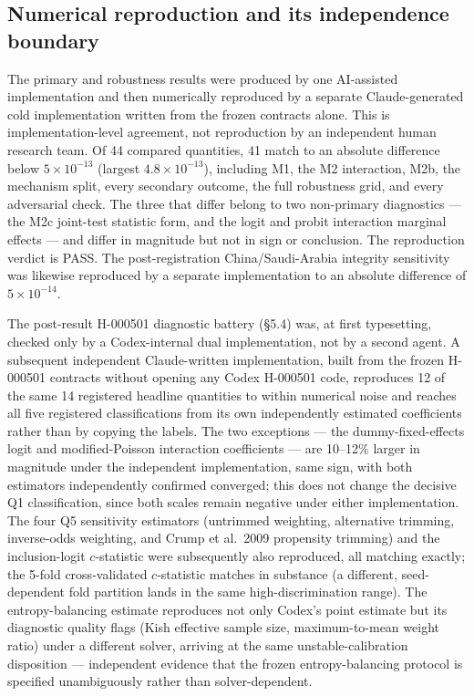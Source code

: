 


\subsection{Numerical reproduction and its independence boundary}

The primary and robustness results were produced by one AI-assisted implementation and then
numerically reproduced by a separate Claude-generated cold implementation written from the
frozen contracts alone. This is implementation-level agreement, not reproduction by an
independent human research team. Of 44 compared
quantities, 41 match to an absolute difference below $5\times10^{-13}$ (largest
$4.8\times10^{-13}$), including M1, the M2 interaction, M2b, the mechanism split, every
secondary outcome, the full robustness grid, and every adversarial check. The three that
differ belong to two non-primary diagnostics --- the M2c joint-test statistic form, and the
logit and probit interaction marginal effects --- and differ in magnitude but not in sign or
conclusion. The reproduction verdict is PASS. The post-registration China/Saudi-Arabia
integrity sensitivity was likewise reproduced by a separate implementation to an absolute
difference of $5\times10^{-14}$.

The post-result H-000501 diagnostic battery (\S5.4) was, at first typesetting, checked only by
a Codex-internal dual implementation, not by a second agent. A subsequent independent
Claude-written implementation, built from the frozen H-000501 contracts without opening any
Codex H-000501 code, reproduces 12 of the same 14 registered headline quantities to within
numerical noise and reaches all five registered classifications from its own independently
estimated coefficients rather than by copying the labels. The two exceptions --- the
dummy-fixed-effects logit and modified-Poisson interaction coefficients --- are 10--12\% larger
in magnitude under the independent implementation, same sign, with both estimators
independently confirmed converged; this does not change the decisive Q1 classification, since
both scales remain negative under either implementation. The four Q5 sensitivity estimators
(untrimmed weighting, alternative trimming, inverse-odds weighting, and Crump et al.\ 2009
propensity trimming) and the inclusion-logit $c$-statistic were subsequently also reproduced,
all matching exactly; the 5-fold cross-validated $c$-statistic matches in substance (a
different, seed-dependent fold partition lands in the same high-discrimination range). The
entropy-balancing estimate reproduces not only Codex's point estimate but its diagnostic
quality flags (Kish effective sample size, maximum-to-mean weight ratio) under a different
solver, arriving at the same unstable-calibration disposition --- independent evidence that
the frozen entropy-balancing protocol is specified unambiguously rather than solver-dependent.

